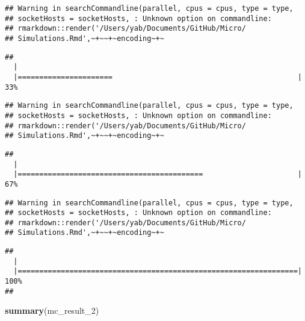 \documentclass[]{article}
\newenvironment{Shaded}{\begin{snugshade}}{\end{snugshade}}
\newcommand{\DecValTok}[1]{\textcolor[rgb]{0.00,0.00,0.81}{#1}}
\newcommand{\KeywordTok}[1]{\textcolor[rgb]{0.13,0.29,0.53}{\textbf{#1}}}
\newcommand{\NormalTok}[1]{#1}
\begin{document}
\begin{verbatim}
## Warning in searchCommandline(parallel, cpus = cpus, type = type,
## socketHosts = socketHosts, : Unknown option on commandline:
## rmarkdown::render('/Users/yab/Documents/GitHub/Micro/
## Simulations.Rmd',~+~~+~encoding~+~
\end{verbatim}

\begin{verbatim}
## 
  |                                                                       
  |======================                                           |  33%
\end{verbatim}

\begin{verbatim}
## Warning in searchCommandline(parallel, cpus = cpus, type = type,
## socketHosts = socketHosts, : Unknown option on commandline:
## rmarkdown::render('/Users/yab/Documents/GitHub/Micro/
## Simulations.Rmd',~+~~+~encoding~+~
\end{verbatim}

\begin{verbatim}
## 
  |                                                                       
  |===========================================                      |  67%
\end{verbatim}

\begin{verbatim}
## Warning in searchCommandline(parallel, cpus = cpus, type = type,
## socketHosts = socketHosts, : Unknown option on commandline:
## rmarkdown::render('/Users/yab/Documents/GitHub/Micro/
## Simulations.Rmd',~+~~+~encoding~+~
\end{verbatim}

\begin{verbatim}
## 
  |                                                                       
  |=================================================================| 100%
## 
\end{verbatim}

\begin{Shaded}
\begin{Highlighting}[]
\KeywordTok{summary}\NormalTok{(mc_result_}\DecValTok{2}\NormalTok{)}
\end{Highlighting}
\end{Shaded}
\end{document}
